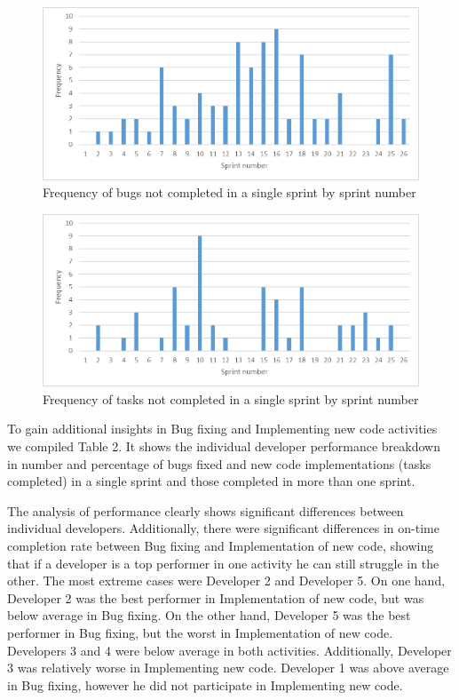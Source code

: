 \begin{figure}
	\centering
	\includegraphics[width=\linewidth]{figures/frequency-of-bugs}
	\caption{Frequency of bugs not completed in a single sprint by sprint number}
	\label{fig:frequency-of-bugs}
\end{figure}

\begin{figure}
	\centering
	\includegraphics[width=\linewidth]{figures/frequency-of-tasks}
	\caption{Frequency of tasks not completed in a single sprint by sprint number}
	\label{fig:frequency-of-tasks}
\end{figure}


To gain additional insights in Bug fixing and Implementing new code activities we compiled Table 2. It shows the individual developer performance breakdown in number and percentage of bugs fixed and new code implementations (tasks completed) in a single sprint and those completed in more than one sprint. 



The analysis of performance clearly shows significant differences between individual developers. Additionally, there were significant differences in on-time completion rate between Bug fixing and Implementation of new code, showing that if a developer is a top performer in one activity he can still struggle in the other. The most extreme cases were Developer 2 and Developer 5. On one hand, Developer 2 was the best performer in Implementation of new code, but was below average in Bug fixing. On the other hand, Developer 5 was the best performer in Bug fixing, but the worst in Implementation of new code. Developers 3 and 4 were below average in both activities. Additionally, Developer 3 was relatively worse in Implementing new code. Developer 1 was above average in Bug fixing, however he did not participate in Implementing new code.

